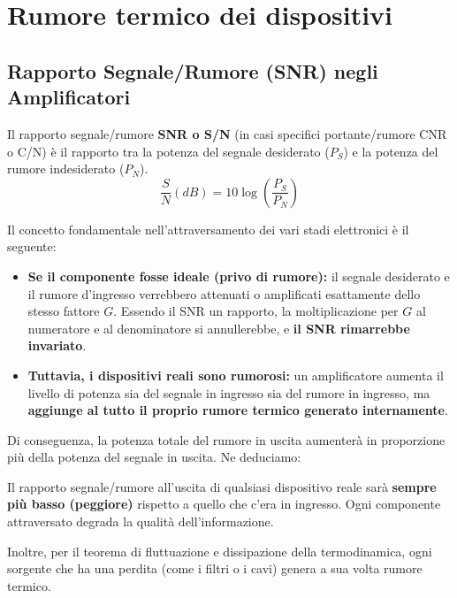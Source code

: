 \documentclass[openany,a4paper,12pt]{book}
\begin{document}
\section{Rumore termico dei dispositivi}
\subsection*{Rapporto Segnale/Rumore (SNR) negli Amplificatori}

Il rapporto segnale/rumore \textbf{SNR o S/N} (in casi specifici portante/rumore CNR o C/N) è il rapporto tra la potenza del segnale desiderato ($P_S$) e la potenza del rumore indesiderato ($P_N$).
\begin{equation}
    \frac{S}{N} (dB) = 10 \log \left( \frac{P_S}{P_N} \right)
\end{equation}

Il concetto fondamentale nell'attraversamento dei vari stadi elettronici è il seguente:
\begin{itemize}[label=\textcolor{PoliBlue}{\textbullet}]
    \item \textbf{Se il componente fosse ideale (privo di rumore):} il segnale desiderato e il rumore d'ingresso verrebbero attenuati o amplificati esattamente dello stesso fattore $G$. Essendo il SNR un rapporto, la moltiplicazione per $G$ al numeratore e al denominatore si annullerebbe, e \textbf{il SNR rimarrebbe invariato}.
    \item \textbf{Tuttavia, i dispositivi reali sono rumorosi:} un amplificatore aumenta il livello di potenza sia del segnale in ingresso sia del rumore in ingresso, ma \textbf{aggiunge al tutto il proprio rumore termico generato internamente}.
\end{itemize}

Di conseguenza, la potenza totale del rumore in uscita aumenterà in proporzione più della potenza del segnale in uscita. Ne deduciamo:
\begin{nota}
    Il rapporto segnale/rumore all'uscita di qualsiasi dispositivo reale sarà \textbf{sempre più basso (peggiore)} rispetto a quello che c'era in ingresso. Ogni componente attraversato degrada la qualità dell'informazione.
\end{nota}

Inoltre, per il teorema di fluttuazione e dissipazione della termodinamica, ogni sorgente che ha una perdita (come i filtri o i cavi) genera a sua volta rumore termico.


\end{document}
